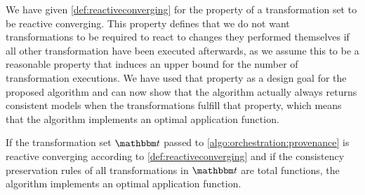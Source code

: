 We have given \autoref{def:reactiveconverging} for the property of a transformation set to be reactive converging.
This property defines that we do not want transformations to be required to react to changes they performed themselves if all other transformation have been executed afterwards, as we assume this to be a reasonable property that induces an upper bound for the number of transformation executions.
We have used that property as a design goal for the proposed algorithm and can now show that the algorithm actually always returns consistent models when the transformations fulfill that property, which means that the algorithm implements an optimal application function.

\begin{theorem}
    If the transformation set $\transformationset{T}$ passed to \autoref{algo:orchestration:provenance} is reactive converging according to \autoref{def:reactiveconverging} and if the consistency preservation rules of all transformations in $\transformationset{T}$ are total functions, the algorithm implements an optimal application function.
\end{theorem}
